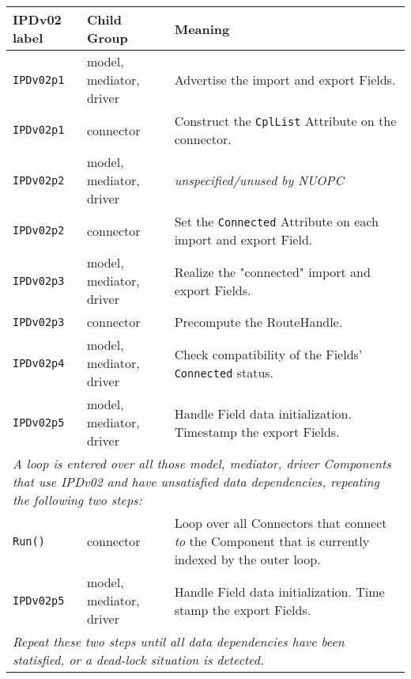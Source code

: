 \vspace*{3ex}
\begin{tabular}[h]{|p{35mm}|p{4cm}|p{6cm}|}
     \hline\hline
     {\bf IPDv02 label} & {\bf Child Group} & {\bf Meaning}\\
     \hline\hline
     {\tt IPDv02p1} & model, mediator, driver & Advertise the import and export Fields.\\ \hline
     {\tt IPDv02p1} & connector               & Construct the {\tt CplList} Attribute on the connector.\\ \hline
     {\tt IPDv02p2} & model, mediator, driver & {\em unspecified/unused by NUOPC}\\ \hline
     {\tt IPDv02p2} & connector               & Set the {\tt Connected} Attribute on each import and export Field.\\ \hline
     {\tt IPDv02p3} & model, mediator, driver & Realize the "connected" import and export Fields.\\ \hline
     {\tt IPDv02p3} & connector               & Precompute the RouteHandle.\\ \hline
     {\tt IPDv02p4} & model, mediator, driver & Check compatibility of the Fields' {\tt Connected} status.\\ \hline
     {\tt IPDv02p5} & model, mediator, driver & Handle Field data initialization. Timestamp the export Fields.\\ \hline
     \multicolumn{3}{|p{13.5cm}|}{\it A loop is entered over all those model, mediator, driver Components that use IPDv02 and have
     unsatisfied data dependencies, repeating the following two steps:}\\ \hline
     {\tt Run()}    & connector               & Loop over all Connectors that connect {\it to} the Component that is currently indexed by the outer loop.\\ \hline
     {\tt IPDv02p5} & model, mediator, driver & Handle Field data initialization. Time stamp the export Fields.\\ \hline
     \multicolumn{3}{|p{13.5cm}|}{\it Repeat these two steps until all data
     dependencies have been statisfied, or a dead-lock situation is detected.}\\ 
     \hline\hline
\end{tabular}\newline

